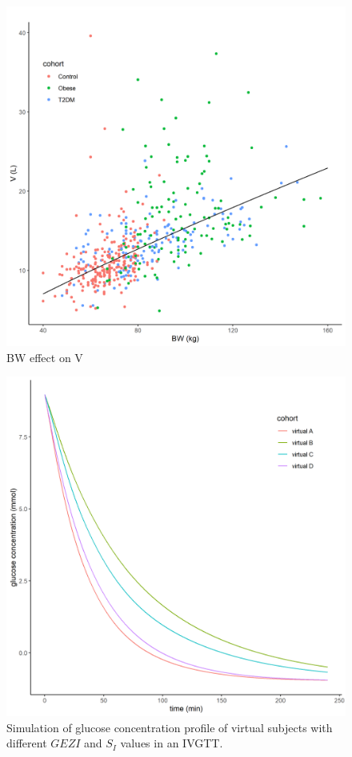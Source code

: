\documentclass[utf8]{frontiersSCNS} %
\begin{document}
\begin{figure}[h!]
\begin{center}
\includegraphics[width=15cm]{V_BW.PNG}
\end{center}
\caption{BW effect on V}
\label{fig: V_BW}
\end{figure}

\begin{figure}[h!]
\begin{center}
\includegraphics[width=15cm]{p.PNG}
\end{center}
\caption{Simulation of glucose concentration profile of virtual subjects with different $GEZI$ and $S_I$ values in an IVGTT. }
\label{fig: simu}
\end{figure}
\end{document}
